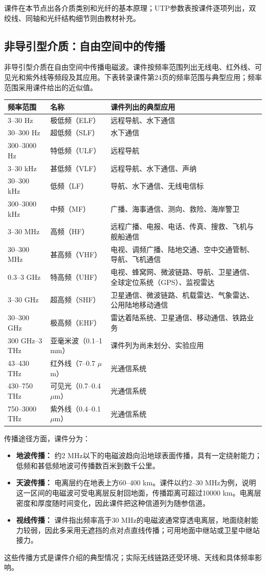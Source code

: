 课件在本节点出各介质类别和光纤的基本原理；UTP参数表按课件逐项列出，双绞线、同轴和光纤结构细节则由教材补充。
\annotationarea[4]

\subsection{非导引型介质：自由空间中的传播}
非导引型介质在自由空间中传播电磁波。课件按频率范围列出无线电、红外线、可见光和紫外线等频段及其应用。下表转录课件第24页的频率范围与典型应用；频率范围采用课件给出的近似值。
\begin{center}
\small
\begin{tabularx}{0.97\textwidth}{l l X}
\toprule
频率范围 & 名称 & 课件列出的典型应用\\
\midrule
3--30 Hz & 极低频（ELF） & 远程导航、水下通信\\
30--300 Hz & 超低频（SLF） & 水下通信\\
300--3000 Hz & 特低频（ULF） & 远程导航\\
3--30 kHz & 甚低频（VLF） & 远程导航、水下通信、声纳\\
30--300 kHz & 低频（LF） & 导航、水下通信、无线电信标\\
300--3000 kHz & 中频（MF） & 广播、海事通信、测向、救险、海岸警卫\\
3--30 MHz & 高频（HF） & 远程广播、电报、电话、传真、搜救、飞机与舰船通信\\
30--300 MHz & 甚高频（VHF） & 电视、调频广播、陆地交通、空中交通管制、导航、飞机通信\\
0.3--3 GHz & 特高频（UHF） & 电视、蜂窝网、微波链路、导航、卫星通信、全球定位系统（GPS）、监视雷达\\
3--30 GHz & 超高频（SHF） & 卫星通信、微波链路、机载雷达、气象雷达、公用陆地移动通信\\
30--300 GHz & 极高频（EHF） & 雷达着陆系统、卫星通信、移动通信、铁路业务\\
300 GHz--3 THz & 亚毫米波（0.1--1 mm） & 课件列为尚未划分、实验应用\\
43--430 THz & 红外线（7--0.7 $\mu$m） & 光通信系统\\
430--750 THz & 可见光（0.7--0.4 $\mu$m） & 光通信系统\\
750--3000 THz & 紫外线（0.4--0.1 $\mu$m） & 光通信系统\\
\bottomrule
\end{tabularx}
\end{center}

传播途径方面，课件分为：
\begin{itemize}
 \item \textbf{地波传播：} 约2 MHz以下的电磁波趋向沿地球表面传播，具有一定绕射能力；低频和甚低频地波可传播数百米到数千公里。
 \item \textbf{天波传播：} 电离层约在地表上方60--400 km。课件以约2--30 MHz为例，说明这一区间的电磁波可受电离层反射回地面，传播距离可超过10000 km。电离层密度和厚度随时间变化，因此课件把这种信道列为随参信道。
 \item \textbf{视线传播：} 课件指出频率高于30 MHz的电磁波通常穿透电离层，地面绕射能力较弱，因此多采用无遮挡的点对点直线传播；可用地面中继站或卫星中继站接力。
\end{itemize}
这些传播方式是课件介绍的典型情况；实际无线链路还受环境、天线和具体频率影响。

